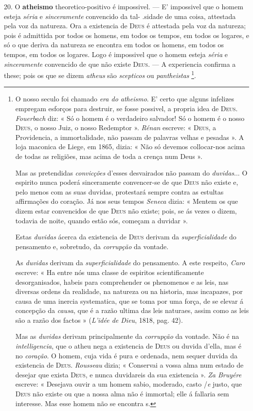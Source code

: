 20. O \textbf{atheismo} theoretico-positivo é impossivel. --- E' impossivel que o homem esteja \emph{séria} e \emph{sinceramente} convencido da tal- .sidade de uma coisa, attestada pela voz da natureza. Ora a existencia de \textsc{Deus} é attestada pela voz da natureza; pois é admittida por todos os homens, em todos os tempos, em todos os logares, e só o que deriva da natureza se encontra em todos os homens, em todos os tempos, em todos os logares. Logo é impossivel que o homem esteja \emph{séria} e \emph{sinceramente} convencido de que não existe \textsc{Deus}. --- A experiencia confirma a these; pois os que se dizem \emph{atheus} são \emph{scepticos} ou \emph{pantheistas} \footnote{O nosso seculo foi chamado \emph{era do atheismo}. E' certo que alguns infelizes empregam esforços para destruir, se fosse possivel, a propria idea de \textsc{Deus}. \emph{Fouerbach} diz: « Só o homem é o verdadeiro salvador! Só o homem é o nosso \textsc{Deus}, o nosso Juiz, o nosso Redemptor ». \emph{Rénan} escreve: « \textsc{Deus}, a Providencia, a immortalidade, não passam de palavras velhas e pesadas ». A loja maconica de Liege, em 1865, dizia: « Não só devemos collocar-nos acima de todas as religiões, mas acima de toda a crença num Deus ».\par Mas as pretendidas \emph{convicções} d'esses desvairados não passam do \emph{duvidas}... O espirito nunca poderá sinceramente convencer-se de que \textsc{Deus} não existe e, pelo menos com as suas duvidas, protestará sempre contra as estultas affirmações do coração. Já nos seus tempos \emph{Seneca} dizia: « Mentem os que dizem estar convencidos de que \textsc{Deus} não existe; pois, se ás vezes o dizem, todavia de noite, quando estão sós, começam a duvidar ».\par Estas \emph{duvidas} ácerca da existencia de \textsc{Deus} derivam da \emph{superficialidade} do pensamento e, sobretudo, da \emph{corrupção} da vontade.\par As \emph{duvidas} derivam da \emph{superficialidade} do pensamento. A este respeito, \emph{Caro} escreve: « Ha entre nós uma classe de espiritos scientificamente desorganisados, habeis para comprehender os phenomenos e as leis, nas diversas ordens da realidade, na natureza ou na historia, mas incapazes, por causa de uma inercia systematica, que se toma por uma força, de se elevar á concepção da \emph{causa}, que é a razão ultima das leis naturaes, assim como as leis são a razão dos factos » (\emph{L'idée de Dieu}, 1818, pag. 42).\par Mas as \emph{duvidas} derivam principalmente da \emph{corrupção} da vontade. Não é na \emph{intelligencia}, que o atheu nega a existencia de \textsc{Deus} ou duvida d'ella, mas é no \emph{coração}. O homem, cuja vida é pura e ordenada, nem sequer duvida da existencia de \textsc{Deus}. \emph{Rousseau} dizia; « Conservai a vossa alma num estado de desejar que exista \textsc{Deus}, e nunca duvidareis da sua existencia ». \emph{Za Bruyére} escreve: « Desejava ouvir a um homem sabio, moderado, casto /\emph{e} justo, que \textsc{Deus} não existe ou que a nossa alma não é immortal; elle á fallaria sem interesse. Mas esse homem não se encontra s.}.

